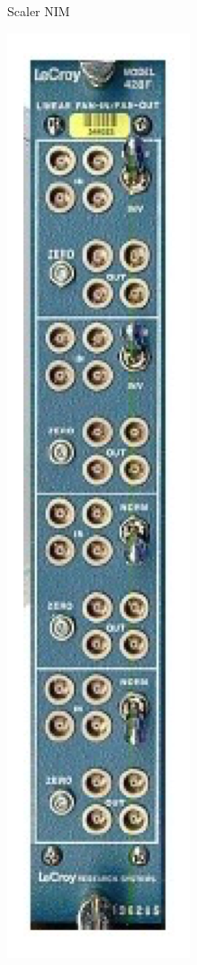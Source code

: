 \begin{figure}[!h]
\begin{subfigure}[t]{0.2\textwidth}
        \caption{Scaler NIM}
        \label{fig:scaler1}
    \end{subfigure}
    \hfill
    \begin{subfigure}[t]{0.2\textwidth}
        \includegraphics[height=0.25\textheight, width=\textwidth, keepaspectratio]{figures/FanInFanOut.png}

\end{subfigure}
\end{figure}
